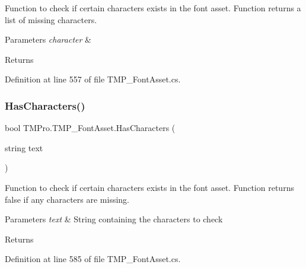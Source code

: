 Function to check if certain characters exists in the font asset. Function returns a list of missing characters. 


\begin{DoxyParams}{Parameters}
{\em character} & \\
\hline
\end{DoxyParams}
\begin{DoxyReturn}{Returns}

\end{DoxyReturn}


Definition at line 557 of file T\+M\+P\+\_\+\+Font\+Asset.\+cs.

\mbox{\label{class_t_m_pro_1_1_t_m_p___font_asset_a6432ab839d799b8e91d1c279946c03cf}} 
\subsubsection{\texorpdfstring{HasCharacters()}{HasCharacters()}\hspace{0.1cm}{\footnotesize\ttfamily [2/2]}}
{\footnotesize\ttfamily bool T\+M\+Pro.\+T\+M\+P\+\_\+\+Font\+Asset.\+Has\+Characters (\begin{DoxyParamCaption}\item[{string}]{text }\end{DoxyParamCaption})}



Function to check if certain characters exists in the font asset. Function returns false if any characters are missing. 


\begin{DoxyParams}{Parameters}
{\em text} & String containing the characters to check\\
\hline
\end{DoxyParams}
\begin{DoxyReturn}{Returns}

\end{DoxyReturn}


Definition at line 585 of file T\+M\+P\+\_\+\+Font\+Asset.\+cs.

\mbox{\label{class_t_m_pro_1_1_t_m_p___font_asset_aecaed95f724698d0c77f8d38eab90640}} 
